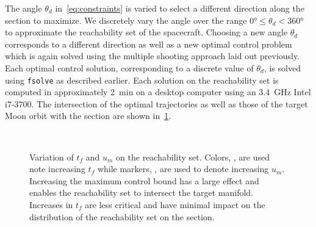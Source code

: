 The angle \( \theta_d\) in~\cref{eq:constraints} is varied to select a different direction along the \Poincare section to maximize.
We discretely vary the angle over the range \( \ang{0} \leq \theta_d < \ang{360} \) to approximate the reachability set of the spacecraft.
Choosing a new angle \( \theta_d \) corresponds to a different direction as well as a new optimal control problem which is again solved using the multiple shooting approach laid out previously.
Each optimal control solution, corresponding to a discrete value of \( \theta_d \), is solved using \texttt{fsolve} as described earlier. 
Each solution on the reachability set is computed in approximately \SI{2}{\minute} on a desktop computer using an \SI{3.4}{\giga\hertz} Intel i7-3700.
The intersection of the optimal trajectories as well as those of the target Moon orbit with the \Poincare section are shown in~\cref{fig:varying_tf_reachability_sets}.

\begin{figure}
    ~
    \caption{Variation of \( t_f \) and \( u_m\) on the reachability set. 
        Colors, , are used note increasing \( t_f\) while markers, , are used to denote increasing \(u_m\).
    Increasing the maximum control bound has a large effect and enables the reachability set to intersect the target manifold. 
    Increases in \(t_f\) are less critical and have minimal impact on the distribution of the reachability set on the \Poincare section.~\label{fig:varying_tf_reachability_sets}}
\end{figure}

